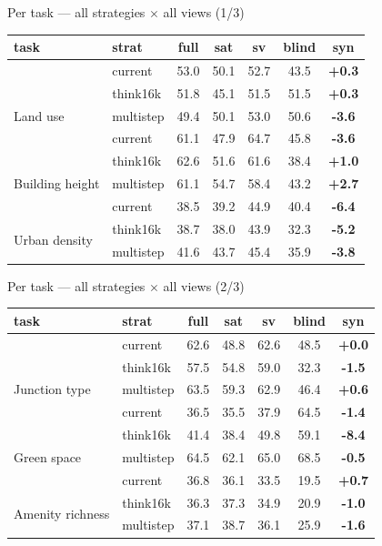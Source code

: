 \documentclass[aspectratio=169]{beamer}
\begin{document}
\begin{frame}{Per task --- all strategies $\times$ all views (1/3)}
\centering\scriptsize
\begin{tabular}{llcccc>{\bfseries}c}
\toprule
task & strat & full & sat & sv & blind & syn \\
\midrule
 & current & 53.0 & 50.1 & 52.7 & 43.5 & +0.3 \\
\multirow{3}{*}{Land use} & think16k & 51.8 & 45.1 & 51.5 & 51.5 & +0.3 \\
 & multistep & 49.4 & 50.1 & 53.0 & 50.6 & \textcolor{bad}{-3.6} \\
\midrule
 & current & 61.1 & 47.9 & 64.7 & 45.8 & \textcolor{bad}{-3.6} \\
\multirow{3}{*}{Building height} & think16k & 62.6 & 51.6 & 61.6 & 38.4 & +1.0 \\
 & multistep & 61.1 & 54.7 & 58.4 & 43.2 & +2.7 \\
\midrule
 & current & 38.5 & 39.2 & 44.9 & 40.4 & \textcolor{bad}{-6.4} \\
\multirow{3}{*}{Urban density} & think16k & 38.7 & 38.0 & 43.9 & 32.3 & \textcolor{bad}{-5.2} \\
 & multistep & 41.6 & 43.7 & 45.4 & 35.9 & \textcolor{bad}{-3.8} \\
\bottomrule
\end{tabular}
\end{frame}
\begin{frame}{Per task --- all strategies $\times$ all views (2/3)}
\centering\scriptsize
\begin{tabular}{llcccc>{\bfseries}c}
\toprule
task & strat & full & sat & sv & blind & syn \\
\midrule
 & current & 62.6 & 48.8 & 62.6 & 48.5 & +0.0 \\
\multirow{3}{*}{Junction type} & think16k & 57.5 & 54.8 & 59.0 & 32.3 & \textcolor{bad}{-1.5} \\
 & multistep & 63.5 & 59.3 & 62.9 & 46.4 & +0.6 \\
\midrule
 & current & 36.5 & 35.5 & 37.9 & 64.5 & \textcolor{bad}{-1.4} \\
\multirow{3}{*}{Green space} & think16k & 41.4 & 38.4 & 49.8 & 59.1 & \textcolor{bad}{-8.4} \\
 & multistep & 64.5 & 62.1 & 65.0 & 68.5 & -0.5 \\
\midrule
 & current & 36.8 & 36.1 & 33.5 & 19.5 & +0.7 \\
\multirow{3}{*}{Amenity richness} & think16k & 36.3 & 37.3 & 34.9 & 20.9 & \textcolor{bad}{-1.0} \\
 & multistep & 37.1 & 38.7 & 36.1 & 25.9 & \textcolor{bad}{-1.6} \\
\bottomrule
\end{tabular}
\end{frame}
\end{document}
